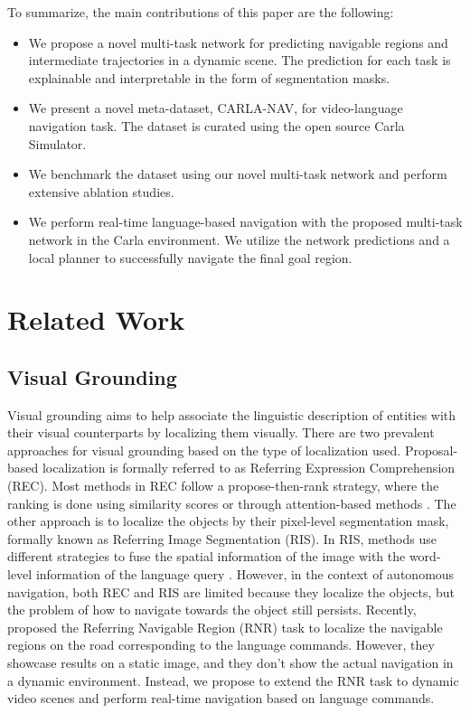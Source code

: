 \documentclass[letterpaper, 10 pt, conference]{ieeeconf}  %
\begin{document}
To summarize, the main contributions of this paper are the following:
\begin{itemize}

\item We propose a novel multi-task network for predicting navigable regions and intermediate trajectories in a dynamic scene. The prediction for each task is explainable and interpretable in the form of segmentation masks.
\item We present a novel meta-dataset, CARLA-NAV, for video-language navigation task. The dataset is curated using the open source Carla Simulator.
\item We benchmark the dataset using our novel multi-task network and perform extensive ablation studies.
\item We perform real-time language-based navigation with the proposed multi-task network in the Carla environment. We utilize the network predictions and a local planner to successfully navigate the final goal region.

\end{itemize}


\section{Related Work}

\subsection{Visual Grounding}

Visual grounding aims to help associate the linguistic description of entities with their visual counterparts by localizing them visually. There are two prevalent approaches for visual grounding based on the type of localization used. Proposal-based localization is formally referred to as Referring Expression Comprehension (REC). Most methods in REC follow a propose-then-rank strategy, where the ranking is done using similarity scores \cite{rohrbach2016grounding, hu2016natural, plummer2018conditional, rufus2020cosine} or through attention-based methods \cite{deng2018visual, zhang2018grounding, yang2019dynamic, qiu2020language}. The other approach is to localize the objects by their pixel-level segmentation mask, formally known as Referring Image Segmentation (RIS). In RIS, methods use different strategies to fuse the spatial information of the image with the word-level information of the language query \cite{shi2018key, ye2019cross, huang2020referring, jain2021comprehensive}. However, in the context of autonomous navigation, both REC and RIS are limited because they localize the objects, but the problem of how to navigate towards the object still persists. Recently, \cite{rufus2021grounding} proposed the Referring Navigable Region (RNR) task to localize the navigable regions on the road corresponding to the language commands. However, they showcase results on a static image, and they don't show the actual navigation in a dynamic environment. Instead, we propose to extend the RNR task to dynamic video scenes and perform real-time navigation based on language commands.
\end{document}
